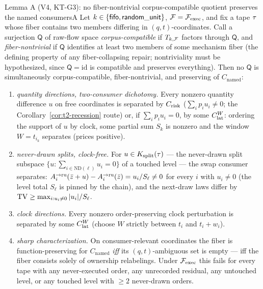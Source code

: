\begin{preregthm}{Lemma A (V4, KT-G3): no fiber-nontrivial corpus-compatible
quotient preserves the named consumers}{A}
\label{lem:v4-a}
Let $k \in \{\kfifo, \kru\}$, $\mathcal{F} = \Fexec$, and fix a tape $\tape$
whose fiber contains two members differing in $(q,t)$-coordinates. Call a
surjection $\mathsf{Q}$ of raw-flow space \emph{corpus-compatible} if
$\recordedmap$ factors through $\mathsf{Q}$, and \emph{fiber-nontrivial} if
$\mathsf{Q}$ identifies at least two members of some mechanism fiber (the
defining property of any fiber-collapsing repair; nontriviality must be
hypothesized, since $\mathsf{Q} = \mathrm{id}$ is compatible and preserves
everything). Then no $\mathsf{Q}$ is
simultaneously corpus-compatible, fiber-nontrivial, and preserving of
$C_{\mathrm{named}}$:
\begin{enumerate}
\item[(A.1)] \emph{quantity directions, two-consumer dichotomy.} Every
nonzero quantity difference $u$ on free coordinates is separated by
$\Crisk$ ($\sum_i p_i u_i \ne 0$; the Corollary~\ref{cor:t2-recession}
route) or, if $\sum_i p_i u_i = 0$, by some $\Clat[W]$: ordering the support
of $u$ by clock, some partial sum $S_k$ is nonzero and the window
$W = t_{i_k}$ separates (prices positive).
\item[(A.2)] \emph{never-drawn splits, clock-free.} For
$u \in K_{\mathrm{split}}(\tape)$ --- the never-drawn split subspace
$\{u : \sum_{i \in \mathrm{ND}(\ell)} u_i = 0\}$ of a touched level --- the
swap consumer separates:
$A^{\to\ru}_i(\bar{\rawflow} + u) - A^{\to\ru}_i(\bar{\rawflow}) =
u_i / S_\ell \ne 0$ for every $i$ with $u_i \ne 0$ (the level total
$S_\ell$ is pinned by the  chain), and the next-draw
laws differ by $\TV \ge \max_{i : u_i \ne 0} |u_i|/S_\ell$.
\item[(A.3)] \emph{clock directions.} Every nonzero order-preserving clock
perturbation is separated by some $\Clat[W]$ (choose $W$ strictly between
$t_i$ and $t_i + w_i$).
\item[(A.4)] \emph{sharp characterization.} On consumer-relevant
coordinates the fiber is function-preserving for $C_{\mathrm{named}}$ \emph{iff} its
$(q,t)$-ambiguous set is empty --- iff the fiber consists solely of
ownership relabelings. Under $\Fexec$ this fails for every tape with any
never-executed order, any unrecorded residual, any untouched level, or any
touched level with $\ge 2$ never-drawn orders.
\end{enumerate}
\end{preregthm}

